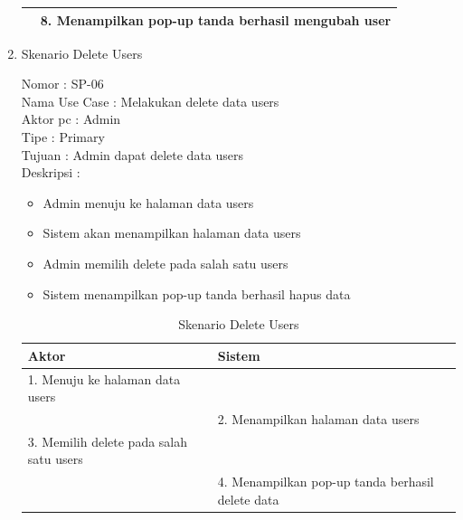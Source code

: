\begin{enumerate}
\begin{table}
\begin{tabular}{ | l | p{65mm} |}
		& 8.	Menampilkan pop-up tanda berhasil mengubah user \\
		\hline
		
	\end{tabular}
\end{table}

\item Skenario Delete Users

Nomor \kern 3.6pc : SP-06 \\
Nama Use Case : Melakukan delete data users \\
Aktor  pc : Admin \\
Tipe \kern 4.6pc : Primary \\
Tujuan \kern 3.6pc : Admin dapat delete data users \\
Deskripsi \kern 2.5pc : 

\begin{itemize}
	\item Admin menuju ke halaman data users
	\item Sistem akan menampilkan halaman data users
	\item Admin memilih delete pada salah satu users
	\item Sistem menampilkan pop-up tanda berhasil hapus data
	
\end{itemize}

\begin{table}
	\caption{Skenario Delete Users}
	\centering
	\begin{tabular}{ | l | p{65mm} |}
		\hline 
		\textbf{Aktor} & \textbf{Sistem} \\
		\hline
		
		1.	Menuju ke halaman data users &  \\
		
		\hline
		
		&  2.	Menampilkan halaman data users \\
		
		\hline
		
		3. Memilih delete pada salah satu users & \\
		
		\hline
		
		& 4.	Menampilkan pop-up tanda berhasil delete data \\
		
		\hline
		
	\end{tabular}
\end{table}


\end{enumerate}
